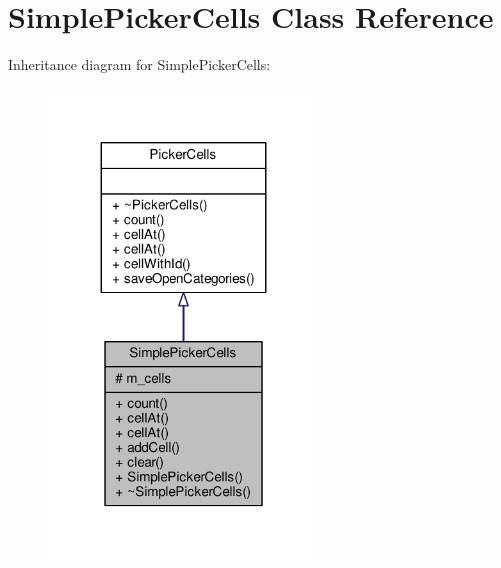\hypertarget{classSimplePickerCells}{}\section{Simple\+Picker\+Cells Class Reference}
\label{classSimplePickerCells}


Inheritance diagram for Simple\+Picker\+Cells\+:
\nopagebreak
\begin{figure}[H]
\begin{center}
\leavevmode
\includegraphics[width=203pt]{d1/d4a/classSimplePickerCells__inherit__graph}
\end{center}
\end{figure}



